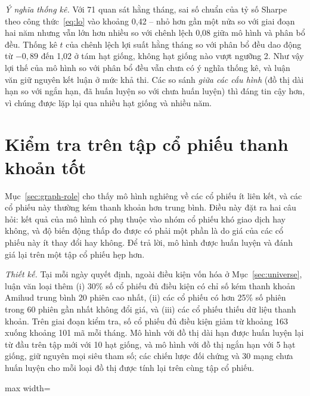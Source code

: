 \textit{Ý nghĩa thống kê.} Với 71 quan sát hằng tháng, sai số chuẩn của tỷ số Sharpe theo công thức~\eqref{eq:lo} vào khoảng 0,42 -- nhỏ hơn gần một nửa so với giai đoạn hai năm nhưng vẫn lớn hơn nhiều so với chênh lệch 0,08 giữa mô hình và phân bổ đều. Thống kê $t$ của chênh lệch lợi suất hằng tháng so với phân bổ đều dao động từ $-0{,}89$ đến 1,02 ở tám hạt giống, không hạt giống nào vượt ngưỡng 2. Như vậy lợi thế của mô hình so với phân bổ đều vẫn chưa có ý nghĩa thống kê, và luận văn giữ nguyên kết luận ở mức khả thi. Các so sánh \emph{giữa các cấu hình} (đồ thị dài hạn so với ngắn hạn, đã huấn luyện so với chưa huấn luyện) thì đáng tin cậy hơn, vì chúng được lặp lại qua nhiều hạt giống và nhiều năm.

\section{Kiểm tra trên tập cổ phiếu thanh khoản tốt}
\label{sec:liquid}

Mục~\ref{sec:graph-role} cho thấy mô hình nghiêng về các cổ phiếu ít liên kết, và các cổ phiếu này thường kém thanh khoản hơn trung bình. Điều này đặt ra hai câu hỏi: kết quả của mô hình có phụ thuộc vào nhóm cổ phiếu khó giao dịch hay không, và độ biến động thấp đo được có phải một phần là do giá của các cổ phiếu này ít thay đổi hay không. Để trả lời, mô hình được huấn luyện và đánh giá lại trên một tập cổ phiếu hẹp hơn.

\textit{Thiết kế.} Tại mỗi ngày quyết định, ngoài điều kiện vốn hóa ở Mục~\ref{sec:universe}, luận văn loại thêm (i) 30\% số cổ phiếu đủ điều kiện có chỉ số kém thanh khoản Amihud trung bình 20 phiên cao nhất, (ii) các cổ phiếu có hơn 25\% số phiên trong 60 phiên gần nhất không đổi giá, và (iii) các cổ phiếu thiếu dữ liệu thanh khoản. Trên giai đoạn kiểm tra, số cổ phiếu đủ điều kiện giảm từ khoảng 163 xuống khoảng 101 mã mỗi tháng. Mô hình với đồ thị dài hạn được huấn luyện lại từ đầu trên tập mới với 10 hạt giống, và mô hình với đồ thị ngắn hạn với 5 hạt giống, giữ nguyên mọi siêu tham số; các chiến lược đối chứng và 30 mạng chưa huấn luyện cho mỗi loại đồ thị được tính lại trên cùng tập cổ phiếu.

\begin{table}[ht]
\centering\footnotesize
\setlength{\tabcolsep}{3.5pt}
\caption{Kết quả trên tập kiểm tra 2024--2025 khi chỉ dùng cổ phiếu thanh khoản tốt (khoảng 101 mã mỗi tháng)}
\label{tab:liquid}
\begin{adjustbox}{max width=\textwidth}\end{adjustbox}
\end{table}


